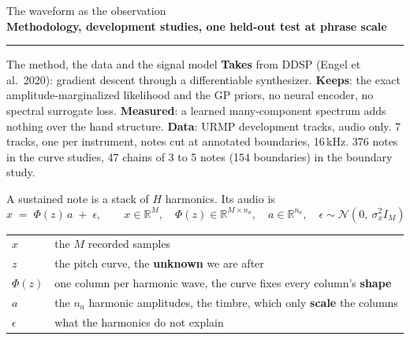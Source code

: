 \documentclass[aspectratio=169,11pt]{beamer}
\newcommand{\divider}[2]{\begin{frame}\centering\vfill
  {\small\textcolor{muted}{#1}}\\[2mm]
  {\LARGE\textbf{#2}}\\[4mm]
  {\color{okblue}\rule{62mm}{1.2pt}}\vfill\end{frame}}
\begin{document}
\divider{The waveform as the observation}{Methodology, development studies, one held-out test at phrase scale}

\begin{frame}{The method, the data and the signal model}
  \small
  \textbf{Takes} from DDSP (Engel et al.\ 2020): gradient descent
  through a differentiable synthesizer. \textbf{Keeps}: the exact
  amplitude-marginalized likelihood and the GP priors, no neural
  encoder, no spectral surrogate loss. \textbf{Measured}: a learned
  many-component spectrum adds nothing over the hand structure.
  \textbf{Data}: URMP development tracks, audio only. 7 tracks, one per
  instrument, notes cut at annotated boundaries, 16\,kHz. 376 notes in
  the curve studies, 47 chains of 3 to 5 notes (154 boundaries) in the
  boundary study.
  \vspace{2mm}

  A sustained note is a stack of $H$ harmonics. Its audio is
  \begin{equation*}
    x \;=\; \Phi(z)\,a \;+\; \epsilon,
    \qquad x \in \mathbb R^{M},\quad \Phi(z) \in \mathbb R^{M\times n_a},\quad
    a \in \mathbb R^{n_a},\quad \epsilon \sim \mathcal N(0,\ \sigma_x^2 I_M)
  \end{equation*}
  \vspace{-2mm}
  \begin{tabular}{@{}ll@{}}
    $x$ & the $M$ recorded samples \\
    $z$ & the pitch curve, the \textbf{unknown} we are after \\
    $\Phi(z)$ & one column per harmonic wave, the curve fixes every column's \textbf{shape} \\
    $a$ & the $n_a$ harmonic amplitudes, the timbre, which only \textbf{scale} the columns \\
    $\epsilon$ & what the harmonics do not explain
  \end{tabular}
\end{frame}
\end{document}
